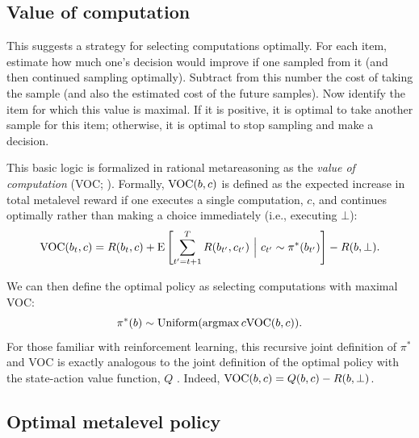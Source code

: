 \subsection{Value of computation}

This suggests a strategy for selecting computations optimally. For each item, estimate how much one's decision would improve if one sampled from it (and then continued sampling optimally). Subtract from this number the cost of taking the sample (and also the estimated cost of the future samples). Now identify the item for which this value is maximal. If it is positive, it is optimal to take another sample for this item; otherwise, it is optimal to stop sampling and make a decision.

This basic logic is formalized in rational metareasoning as the \textit{value of computation} (VOC; \citealp{russell1991principles}). Formally, $\text{VOC}(b, c)$ is defined as the expected increase in total metalevel reward if one executes a single computation, $c$, and continues optimally rather than making a choice immediately (i.e., executing $\bot$):
$$
\text{VOC}(b_t, c) = R(b_t, c) + \operatorname*{E} \left[
  \sum_{t'=t+1}^T R(b_{t'}, c_{t'})\ \Big\vert\ c_{t'} \sim \pi^*(b_{t'}) 
\right] - R(b, \bot).
$$

We can then define the optimal policy as selecting computations with maximal VOC:
$$
\pi^*(b) \sim \text{Uniform}(\operatorname*{argmax}{c} \text{VOC}(b, c)).
$$
For those familiar with reinforcement learning, this recursive joint definition of $\pi^*$ and VOC is exactly analogous to the joint definition of the optimal policy with the state-action value function, $Q$ \citep{sutton2018reinforcement}. Indeed, $\text{VOC}(b, c) = Q(b, c) - R(b, \bot)$. 

\subsection{Optimal metalevel policy}


